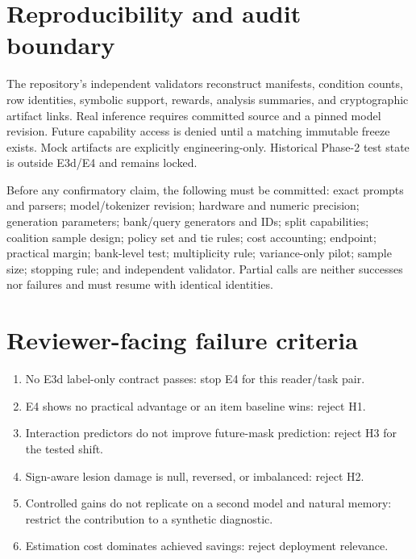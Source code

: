 \section{Reproducibility and audit boundary}
\label{app:repro}

The repository's independent validators reconstruct manifests, condition counts,
row identities, symbolic support, rewards, analysis summaries, and cryptographic
artifact links. Real inference requires committed source and a pinned model
revision. Future capability access is denied until a matching immutable freeze
exists. Mock artifacts are explicitly engineering-only. Historical Phase-2 test
state is outside E3d/E4 and remains locked.

Before any confirmatory claim, the following must be committed: exact prompts and
parsers; model/tokenizer revision; hardware and numeric precision; generation
parameters; bank/query generators and IDs; split capabilities; coalition sample
design; policy set and tie rules; cost accounting; endpoint; practical margin;
bank-level test; multiplicity rule; variance-only pilot; sample size; stopping rule;
and independent validator. Partial calls are neither successes nor failures and must
resume with identical identities.

\section{Reviewer-facing failure criteria}

\begin{enumerate}
    \item No E3d label-only contract passes: stop E4 for this reader/task pair.
    \item E4 shows no practical advantage or an item baseline wins: reject H1.
    \item Interaction predictors do not improve future-mask prediction: reject H3
    for the tested shift.
    \item Sign-aware lesion damage is null, reversed, or imbalanced: reject H2.
    \item Controlled gains do not replicate on a second model and natural memory:
    restrict the contribution to a synthetic diagnostic.
    \item Estimation cost dominates achieved savings: reject deployment relevance.
\end{enumerate}
